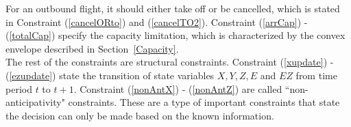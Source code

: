 \documentclass[12pt]{article}
\begin{document}
	\newline
	For an outbound flight, it should either take off or be cancelled, which is stated in Constraint (\ref{cancelORto}) and (\ref{cancelTO2}). Constraint (\ref{arrCap}) - (\ref{totalCap}) specify the capacity limitation, which is characterized by the convex envelope described in Section~\ref{Capacity}.\\
	\newline
	The rest of the constraints are structural constraints. Constraint (\ref{xupdate}) - (\ref{ezupdate}) state the transition of state variables \(X, Y, Z, E\) and \(EZ\) from time period \(t\) to \(t+1\). Constraint (\ref{nonAntX}) - (\ref{nonAntZ}) are called ``non-anticipativity" constraints. These are a type of important constraints that state the decision can only be made based on the known information.  
	
\end{document}

